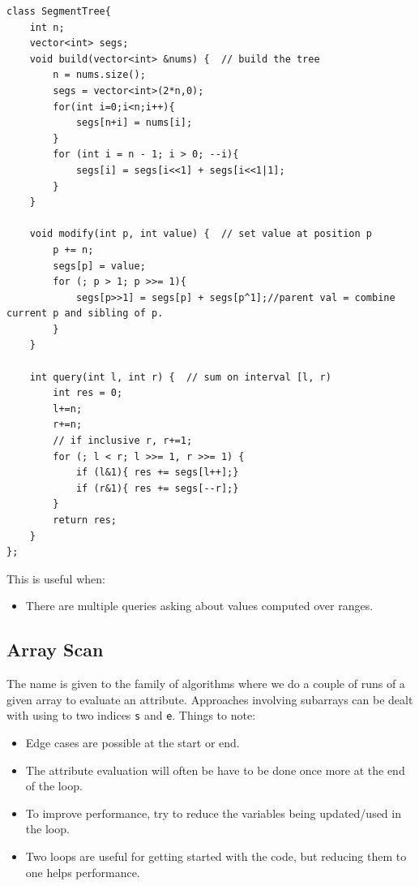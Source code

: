 \documentclass{report}
\begin{document}
\begin{lstlisting}
class SegmentTree{
    int n;
    vector<int> segs;
    void build(vector<int> &nums) {  // build the tree
        n = nums.size();
        segs = vector<int>(2*n,0);
        for(int i=0;i<n;i++){
            segs[n+i] = nums[i];
        }
        for (int i = n - 1; i > 0; --i){
            segs[i] = segs[i<<1] + segs[i<<1|1];
        }
    }

    void modify(int p, int value) {  // set value at position p
        p += n;
        segs[p] = value;
        for (; p > 1; p >>= 1){
            segs[p>>1] = segs[p] + segs[p^1];//parent val = combine current p and sibling of p.
        }
    }

    int query(int l, int r) {  // sum on interval [l, r)
        int res = 0;
        l+=n;
        r+=n;
        // if inclusive r, r+=1;
        for (; l < r; l >>= 1, r >>= 1) {
            if (l&1){ res += segs[l++];}
            if (r&1){ res += segs[--r];}
        }
        return res;
    }
};
\end{lstlisting} 
This is useful when:
\begin{itemize}
\item There are multiple queries asking about values computed over ranges.
\end{itemize}
\subsection{Array Scan}
The name is given to the family of algorithms where we do a couple of runs of a given array to evaluate an attribute. Approaches involving subarrays can be dealt with using to two indices \texttt{s} and \texttt{e}. Things to note:
\begin{itemize}
    \item Edge cases are possible at the start or end.
    \item The attribute evaluation will often be have to be done once more at the end of the loop.
    \item To improve performance, try to reduce the variables being updated/used in the loop.
    \item Two loops are useful for getting started with the code, but reducing them to one helps performance.
\end{itemize}
\end{document}
